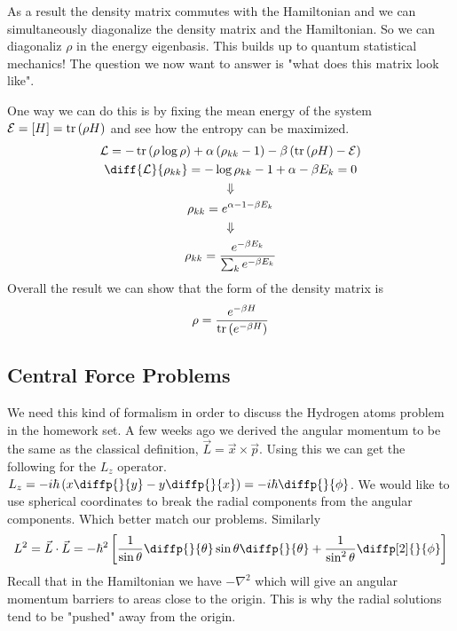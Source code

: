 As a result the density matrix commutes with the
Hamiltonian and we can simultaneously diagonalize the density
matrix and the Hamiltonian. So we can diagonaliz $\rho$ in the
energy eigenbasis. This builds up to quantum statistical mechanics!
The question we now want to answer is "what does this matrix
look like".

One way we can do this is by fixing the mean energy of the
system $\mathcal{E} = \left[H\right] = \operatorname{tr} \left(\rho H\right)$
and see how the entropy can be maximized.
\begin{gather*}
    \mathcal{L} = - \tr \left(\rho \log \rho\right) +
        \alpha \left(\rho_{kk} - 1\right) -
        \beta \left(\tr \left(\rho H\right) - \mathcal{E}\right) \\
    \diff{{\mathcal{L}}}{{\rho_{kk}}} = - \log \rho_{kk} - 1 
        + \alpha - \beta E_k = 0 \\\Downarrow\\
    \rho_{kk} = e^{\alpha - 1 - \beta E_k} \\\Downarrow\\
    \rho_{kk} = \frac{e^{-\beta E_k}}{\sum_k e^{-\beta E_k}}
\end{gather*}
Overall the result we can show that the form of the density matrix is
$$
    \rho = \frac{e^{-\beta H}}{\operatorname{tr} \left(e^{-\beta H}\right)}
$$

\subsection{Central Force Problems}
We need this kind of formalism in order to discuss the Hydrogen atoms problem in the
homework set. A few weeks ago we derived the angular momentum to be the
same as the classical definition, $\vec{L} = \vec{x} \times \vec{p}$. Using this
we can get the following for the $L_z$ operator.
$L_z = -i \hbar \left(x \diffp{}{y} - y \diffp{}{x}\right) = -i \hbar \diffp{}{\phi}$.
We would like to use spherical coordinates to break the radial components from the
angular components. Which better match our problems. Similarly
$$
    L^2 = \vec{L} \cdot \vec{L} = -\hbar^2
        \left[\frac{1}{\sin \theta} \diffp{}{\theta} \sin \theta \diffp{}{\theta}
        + \frac{1}{\sin^2 \theta} \diffp[2]{}{\phi}\right]    
$$
Recall that in the Hamiltonian we have $-\nabla^2$ which will give
an angular momentum barriers to areas close to the origin. This is
why the radial solutions tend to be "pushed" away from the origin.

